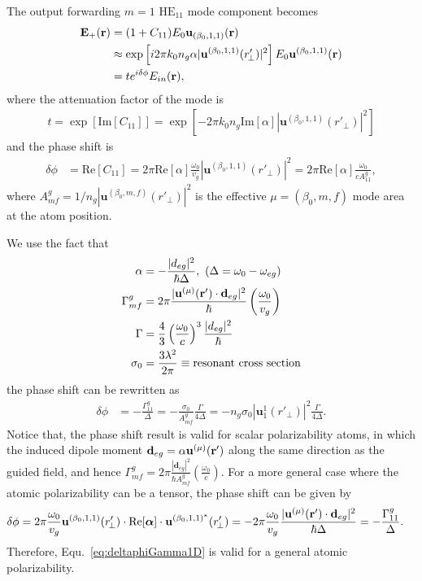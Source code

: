 \documentclass[preprint,aps,pra,onecolumn]{revtex4-1} %
\begin{document}
The output forwarding $ m=1 $ $\mathrm{HE}_{11}$ mode component becomes
\begin{align}
\mathbf{E}_+(\mathbf{r}) &= (1+C_{11})E_0\mathbf{u}_{(\beta_0,1,1)} (\mathbf{r})\\
&\approx \exp\left[i2\pi k_0 n_g\alpha  | \mathbf{u}^{(\beta_0,1,1)}(r'_{\!\perp})|^2 \right] 
E_0\mathbf{u}^{(\beta_0,1,1)} (\mathbf{r})\\
&= {te^{i\delta\phi}} E_{in}(\mathbf{r}), 
\end{align}
where the attenuation factor of the mode is 
\begin{align}
t=\exp\left[\mathrm{Im}[C_{11}]\right]=\exp\left[ -2\pi k_0 n_g \mathrm{Im}[\alpha]  | 
\mathbf{u}^{(\beta_0,1,1)}(r'_{\!\perp})|^2 \right]
\end{align}
and the phase shift is
\begin{align}
\delta\phi &= \mathrm{Re}[C_{11}]= 2\pi \mathrm{Re}[\alpha] \frac{\omega_0}{v_g}  | 
\mathbf{u}^{(\beta_0,1,1)}(r'_{\!\perp})|^2
= 2\pi \mathrm{Re}[\alpha] \frac{\omega_0}{cA^g_{11}},
\end{align}
where $ A^g_{mf}=1/n_g| \mathbf{u}^{(\beta_0,m,f)}(r'_{\!\perp})|^2 $ is the effective $\mu=(\beta_0,m,f)$ mode area at the atom position. 

We use the fact that 
\begin{align}
\alpha &=-\frac{|d_{eg}|^2}{\hbar \Delta}, \,\, (\Delta=\omega_0-\omega_{eg})\\
\Gamma^{g}_{mf} &= 2\pi \frac{|\mathbf{u}^{(\mu)}(\mathbf{r}')\cdot \mathbf{d}_{eg}|^2}{\hbar 
}\left(\frac{\omega_0}{v_g} \right) \label{eq:Gammagmf}\\
\Gamma  &= \frac{4}{3} \left( \frac{\omega_0}{c}\right)^3 \frac{|d_{eg}|^2}{\hbar}\\
\sigma_0 &= \frac{3\lambda^2}{2\pi} \equiv \text{resonant cross section}
\end{align}
the phase shift can be rewritten as
\begin{align}
\delta\phi &= -\frac{\Gamma^{g}_{11}}{\Delta} = - \frac{\sigma_0 
}{A^g_{mf}} \frac{\Gamma}{4\Delta} = -n_g \sigma_0 |\mathbf{u}_1^1 (r'_{\!\perp})|^2 
\frac{\Gamma}{4\Delta}.\label{eq:deltaphiGamma1D}
\end{align}
Notice that, the phase shift result is valid for scalar polarizability atoms, in which the induced dipole 
moment $ \mathbf{d}_{eg} = \alpha \mathbf{u}^{(\mu)}(\mathbf{r}') $ along the same direction as the guided 
field, and hence $ \Gamma^{g}_{mf} = 2\pi 
\frac{| \mathbf{d}_{eg}|^2}{\hbar A^g_{mf}}\left(\frac{\omega_0}{c} \right)  $. For a more general case 
where the atomic polarizability can be a tensor, the phase shift can be given by 
\begin{align}
\delta\phi &= 2\pi  \frac{\omega_0}{v_g}   
\mathbf{u}^{(\beta_0,1,1)}(r'_{\!\perp})\cdot \mathrm{Re}[\boldsymbol{\alpha}] \cdot 
\mathbf{u}^{(\beta_0,1,1)^*}(r'_{\!\perp})
= -2\pi  \frac{\omega_0}{v_g}  \frac{|\mathbf{u}^{(\mu)}(\mathbf{r}')\cdot 
\mathbf{d}_{eg}|^2}{\hbar \Delta} =-\frac{\Gamma_{11}^g}{\Delta}.
\end{align}
Therefore, Equ.~\ref{eq:deltaphiGamma1D} is valid for a general atomic polarizability. 
\end{document}
